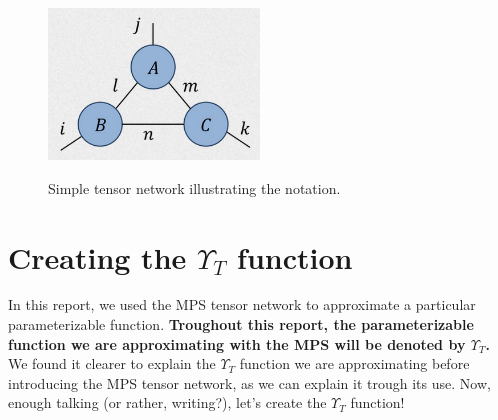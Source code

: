 \documentclass{article}
\theoremstyle{definition}
\theoremstyle{definition}
\begin{document}
\begin{figure}[h]
\centering
\caption{Simple tensor network illustrating the notation.}
\includegraphics[width=0.5\textwidth]{images/2023-03-21-10-22-39.png}
\label{fig:tensor_net}
\end{figure}

\section{Creating the $\Upsilon_{T}$ function}
In this report, we used the MPS tensor network to approximate a particular parameterizable function.
{\bf Troughout this report, the parameterizable function we are approximating with the MPS will be denoted by $\Upsilon_{T}$. }
We found it clearer to explain the $\Upsilon_{T}$ function we are approximating before introducing the MPS tensor network, as we can explain it trough its use.
Now, enough talking (or rather, writing?), let's create the $\Upsilon_{T}$ function!
\end{document}
